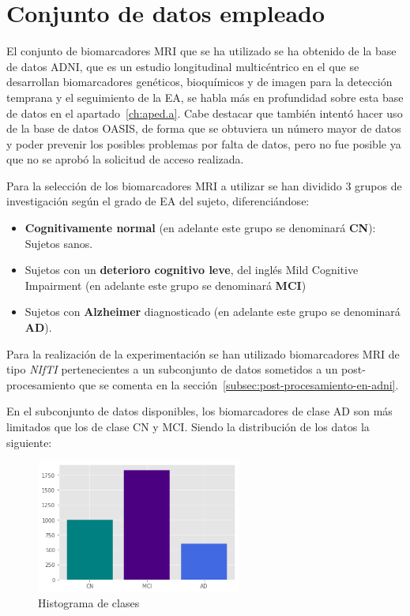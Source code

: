 \section{Conjunto de datos empleado}\label{sec:conjunto-de-datos-empleado}
El conjunto de biomarcadores MRI que se ha utilizado se ha obtenido de la base de datos ADNI, que es un estudio
longitudinal multicéntrico en el que se desarrollan biomarcadores genéticos, bioquímicos y de imagen para la detección
temprana y el seguimiento de la EA, se habla más en profundidad sobre esta base de datos en el
apartado~\ref{ch:aped.a}.
Cabe destacar que también intentó hacer uso de la base de datos OASIS, de forma que se obtuviera un número mayor de
datos y poder prevenir los posibles problemas por falta de datos, pero no fue posible ya que no se aprobó la solicitud
de acceso realizada.

Para la selección de los biomarcadores MRI a utilizar se han dividido 3 grupos de investigación según el grado de EA
del sujeto, diferenciándose:
\begin{itemize}
    \item \textbf{Cognitivamente normal} (en adelante este grupo se denominará \textbf{CN}): Sujetos sanos.
    \item Sujetos con un \textbf{deterioro cognitivo leve}, del inglés Mild Cognitive Impairment (en adelante este grupo
    se denominará \textbf{MCI})
    \item Sujetos con \textbf{Alzheimer} diagnosticado (en adelante este grupo se denominará \textbf{AD}). \\
\end{itemize}

Para la realización de la experimentación se han utilizado biomarcadores MRI de tipo \textit{NIfTI} pertenecientes a un
subconjunto de datos sometidos a un post-procesamiento que se comenta en la sección~\ref{subsec:post-procesamiento-en-adni}.

En el subconjunto de datos disponibles, los biomarcadores de clase \Gls{AD} son más limitados que los de clase \Gls{CN} y \Gls{MCI}.
Siendo la distribución de los datos la siguiente:

\begin{figure}[H]
    \centering
    \includegraphics[width=0.6\textwidth]{./imgs/histograma-de-clases}
    \caption{Histograma de clases}
    \label{fig:histograma-de-clases}
\end{figure}

